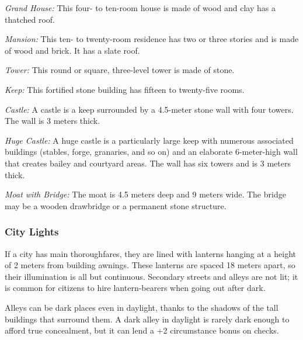 \textit{Grand House:} This four- to ten-room house is made of wood and clay has a thatched roof.

\textit{Mansion:} This ten- to twenty-room residence has two or three stories and is made of wood and brick. It has a slate roof.

\textit{Tower:} This round or square, three-level tower is made of stone.

\textit{Keep:} This fortified stone building has fifteen to twenty-five rooms.

\textit{Castle:} A castle is a keep surrounded by a 4.5-meter stone wall with four towers. The wall is 3 meters thick.

\textit{Huge Castle:} A huge castle is a particularly large keep with numerous associated buildings (stables, forge, granaries, and so on) and an elaborate 6-meter-high wall that creates bailey and courtyard areas. The wall has six towers and is 3 meters thick.

\textit{Moat with Bridge:} The moat is 4.5 meters deep and 9 meters wide. The bridge may be a wooden drawbridge or a permanent stone structure.

\subsubsection{City Lights}
If a city has main thoroughfares, they are lined with lanterns hanging at a height of 2 meters from building awnings. These lanterns are spaced 18 meters apart, so their illumination is all but continuous. Secondary streets and alleys are not lit; it is common for citizens to hire lantern-bearers when going out after dark.

Alleys can be dark places even in daylight, thanks to the shadows of the tall buildings that surround them. A dark alley in daylight is rarely dark enough to afford true concealment, but it can lend a +2 circumstance bonus on  checks.
